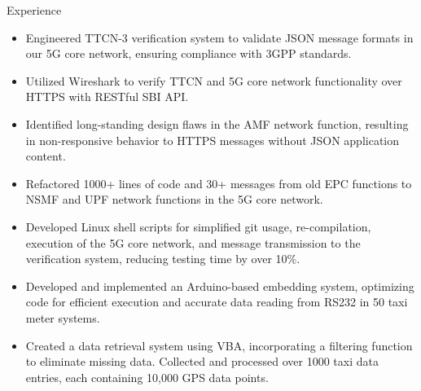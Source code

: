 \documentclass{resume} %
\begin{document}
\begin{workSection}{Experience}
    \experienceItem[
        company=Free5gc Team of NCTU,
        location=Hsinchu{,} Taiwan,
        position=Backend Engineer (Research Assistant),
        duration=Jul 2019 – Nov 2019
    ]
    \vspace{-0.65em}
    \begin{itemize}
        \itemsep -6pt {} 
        \item Engineered TTCN-3 verification system to validate JSON message formats in our 5G core network, ensuring compliance with 3GPP standards.
        \item Utilized Wireshark to verify TTCN and 5G core network functionality over HTTPS with RESTful SBI API.
        \item Identified long-standing design flaws in the AMF network function, resulting in non-responsive behavior to HTTPS messages without JSON application content.
        \item Refactored 1000+ lines of code and 30+ messages from old EPC functions to NSMF and UPF network functions in the 5G core network.
        \item Developed Linux shell scripts for simplified git usage, re-compilation, execution of the 5G core network, and message transmission to the verification system, reducing testing time by over 10\%.
     \end{itemize}

    \experienceItem[
        company=MOTC TW \& NCTU,
        location=Taipei{,} Taiwan,
        position=Embedded System engineer (Research Assistant),
        duration=Jun 2016 – Sep 2016
    ]
    \vspace{-0.65em}
    \begin{itemize}
        \itemsep -6pt {} 
        \item Developed and implemented an Arduino-based embedding system, optimizing code for efficient execution and accurate data reading from RS232 in 50 taxi meter systems.
        \item Created a data retrieval system using VBA, incorporating a filtering function to eliminate missing data. Collected and processed over 1000 taxi data entries, each containing 10,000 GPS data points.
     \end{itemize}
     
\end{workSection}
\end{document}
